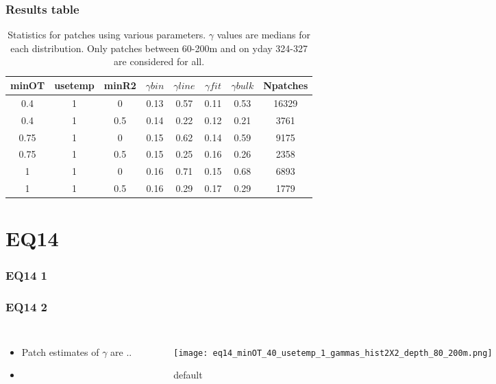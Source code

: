 \documentclass{beamer}
\begin{document}
\begin{frame}
 \frametitle{Results table}


\begin{table}[htdp]
\caption{Statistics for patches using various parameters. $\gamma$ values are medians for each distribution. Only patches between 60-200m and on yday 324-327 are considered for all.}
\begin{center}
\begin{tabular}{|c|c|c|c|c|c|c|c|}
\hline
minOT & usetemp & minR2 & $\gamma bin$ & $\gamma line$ & $\gamma fit$ & $\gamma bulk$ & Npatches \\
\hline
0.4 & 1 & 0 & 0.13 & 0.57 & 0.11 & 0.53 & 16329 \\
\hline
0.4 & 1 & 0.5 & 0.14 & 0.22 & 0.12 & 0.21 & 3761 \\
\hline
0.75 & 1 & 0 & 0.15 & 0.62 & 0.14 & 0.59 & 9175 \\
\hline
0.75 & 1 & 0.5 & 0.15 & 0.25 & 0.16 & 0.26 & 2358 \\
\hline
1 & 1 & 0 & 0.16 & 0.71 & 0.15 & 0.68 & 6893 \\
\hline
1 & 1 & 0.5 & 0.16 & 0.29 & 0.17 & 0.29 & 1779 \\
\hline
\hline
\hline
\end{tabular}
\end{center}
\label{tab}
\end{table}%


\end{frame}




\section{EQ14}

\begin{frame}
 \frametitle{EQ14 1}


\end{frame}


\begin{frame}
 \frametitle{EQ14 2}


\begin{columns}
\begin{itemize}
\item Patch estimates of $\gamma$ are ..
\item 
\end{itemize}

\begin{figure}[htbp]
\begin{center}
\texttt{[image: eq14\_minOT\_40\_usetemp\_1\_gammas\_hist2X2\_depth\_80\_200m.png]}
\caption{default}
\label{default}
\end{center}
\end{figure}

\end{columns}



\end{frame}
\end{document}
